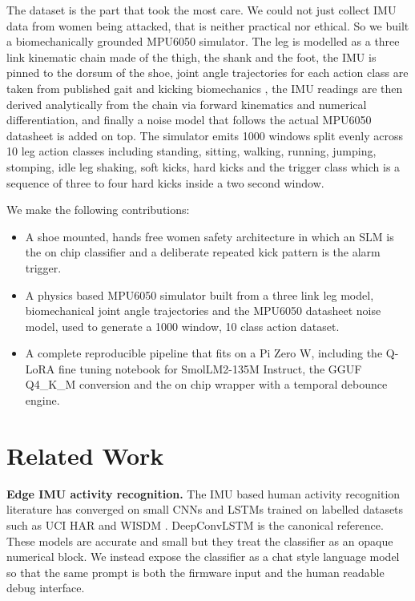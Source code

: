 \documentclass[conference]{IEEEtran}
\begin{document}
The dataset is the part that took the most care. We could not just collect IMU data from women being attacked, that is neither practical nor ethical. So we built a biomechanically grounded MPU6050 simulator. The leg is modelled as a three link kinematic chain made of the thigh, the shank and the foot, the IMU is pinned to the dorsum of the shoe, joint angle trajectories for each action class are taken from published gait and kicking biomechanics \cite{winter2009biomechanics, lees2010biomechanics, kellis2007biomechanical}, the IMU readings are then derived analytically from the chain via forward kinematics and numerical differentiation, and finally a noise model that follows the actual MPU6050 datasheet \cite{invensense2013mpu6050} is added on top. The simulator emits 1000 windows split evenly across 10 leg action classes including standing, sitting, walking, running, jumping, stomping, idle leg shaking, soft kicks, hard kicks and the trigger class which is a sequence of three to four hard kicks inside a two second window.

We make the following contributions:
\begin{itemize}
  \item A shoe mounted, hands free women safety architecture in which an SLM is the on chip classifier and a deliberate repeated kick pattern is the alarm trigger.
  \item A physics based MPU6050 simulator built from a three link leg model, biomechanical joint angle trajectories and the MPU6050 datasheet noise model, used to generate a 1000 window, 10 class action dataset.
  \item A complete reproducible pipeline that fits on a Pi Zero W, including the Q-LoRA fine tuning notebook for SmolLM2-135M Instruct, the GGUF Q4\_K\_M conversion and the on chip wrapper with a temporal debounce engine.
\end{itemize}

\section{Related Work}

\textbf{Edge IMU activity recognition.} The IMU based human activity recognition literature has converged on small CNNs and LSTMs trained on labelled datasets such as UCI HAR \cite{anguita2013har} and WISDM \cite{kwapisz2011activity}. DeepConvLSTM \cite{ordonez2016deep} is the canonical reference. These models are accurate and small but they treat the classifier as an opaque numerical block. We instead expose the classifier as a chat style language model so that the same prompt is both the firmware input and the human readable debug interface.
\end{document}
